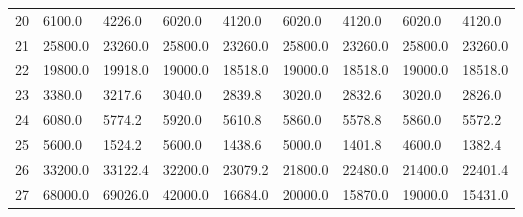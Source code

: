 \begin{tabular}{|r|l|l|l|l|l|l|l|l|}
  20 & 6100.0 & 4226.0 & 6020.0 & 4120.0 & 6020.0 & 4120.0 & 6020.0 & 4120.0 \\ 
  21 & 25800.0 & 23260.0 & 25800.0 & 23260.0 & 25800.0 & 23260.0 & 25800.0 & 23260.0 \\ 
  22 & 19800.0 & 19918.0 & 19000.0 & 18518.0 & 19000.0 & 18518.0 & 19000.0 & 18518.0 \\ 
  23 & 3380.0 & 3217.6 & 3040.0 & 2839.8 & 3020.0 & 2832.6 & 3020.0 & 2826.0 \\ 
  24 & 6080.0 & 5774.2 & 5920.0 & 5610.8 & 5860.0 & 5578.8 & 5860.0 & 5572.2 \\ 
  25 & 5600.0 & 1524.2 & 5600.0 & 1438.6 & 5000.0 & 1401.8 & 4600.0 & 1382.4 \\ 
  26 & 33200.0 & 33122.4 & 32200.0 & 23079.2 & 21800.0 & 22480.0 & 21400.0 & 22401.4 \\ 
  27 & 68000.0 & 69026.0 & 42000.0 & 16684.0 & 20000.0 & 15870.0 & 19000.0 & 15431.0 \\ 
\end{tabular}
